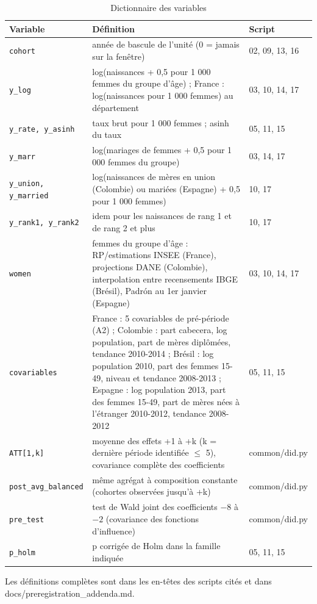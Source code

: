 \begin{table}[htbp]\centering
\begin{threeparttable}
\caption{Dictionnaire des variables}\label{tab:dictionary}
\footnotesize
\begin{tabular}{lp{9.5cm}l}
\toprule
Variable & Définition & Script \\
\midrule
\texttt{cohort} & année de bascule de l'unité (0 = jamais sur la fenêtre) & 02, 09, 13, 16 \\
\texttt{y\_log} & log(naissances + 0,5 pour 1 000 femmes du groupe d'âge) ; France : log(naissances pour 1 000 femmes) au département & 03, 10, 14, 17 \\
\texttt{y\_rate, y\_asinh} & taux brut pour 1 000 femmes ; asinh du taux & 05, 11, 15 \\
\texttt{y\_marr} & log(mariages de femmes + 0,5 pour 1 000 femmes du groupe) & 03, 14, 17 \\
\texttt{y\_union, y\_married} & log(naissances de mères en union (Colombie) ou mariées (Espagne) + 0,5 pour 1 000 femmes) & 10, 17 \\
\texttt{y\_rank1, y\_rank2} & idem pour les naissances de rang 1 et de rang 2 et plus & 10, 17 \\
\texttt{women} & femmes du groupe d'âge : RP/estimations INSEE (France), projections DANE (Colombie), interpolation entre recensements IBGE (Brésil), Padrón au 1er janvier (Espagne) & 03, 10, 14, 17 \\
\texttt{covariables} & France : 5 covariables de pré-période (A2) ; Colombie : part cabecera, log population, part de mères diplômées, tendance 2010-2014 ; Brésil : log population 2010, part des femmes 15-49, niveau et tendance 2008-2013 ; Espagne : log population 2013, part des femmes 15-49, part de mères nées à l'étranger 2010-2012, tendance 2008-2012 & 05, 11, 15 \\
\texttt{ATT[1,k]} & moyenne des effets +1 à +k (k = dernière période identifiée $\leq$ 5), covariance complète des coefficients & common/did.py \\
\texttt{post\_avg\_balanced} & même agrégat à composition constante (cohortes observées jusqu'à +k) & common/did.py \\
\texttt{pre\_test} & test de Wald joint des coefficients $-8$ à $-2$ (covariance des fonctions d'influence) & common/did.py \\
\texttt{p\_holm} & p corrigée de Holm dans la famille indiquée & 05, 11, 15 \\
\bottomrule
\end{tabular}
\begin{tablenotes}\footnotesize
\item Les définitions complètes sont dans les en-têtes des scripts cités et dans docs/preregistration\_addenda.md.
\end{tablenotes}
\end{threeparttable}
\end{table}
